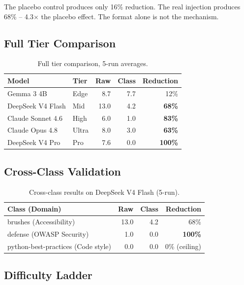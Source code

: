\documentclass{article}
\begin{document}
The placebo control produces only 16\% reduction. The real injection produces
68\% -- 4.3$\times$ the placebo effect. The format alone is not the mechanism.

\subsection{Full Tier Comparison}

\begin{table}[h]
\centering
\begin{tabular}{llrrr}
\toprule
Model & Tier & Raw & Class & Reduction \\
\midrule
Gemma 3 4B & Edge & 8.7 & 7.7 & 12\% \\
DeepSeek V4 Flash & Mid & 13.0 & 4.2 & \textbf{68\%} \\
Claude Sonnet 4.6 & High & 6.0 & 1.0 & \textbf{83\%} \\
Claude Opus 4.8 & Ultra & 8.0 & 3.0 & \textbf{63\%} \\
DeepSeek V4 Pro & Pro & 7.6 & 0.0 & \textbf{100\%} \\
\bottomrule
\end{tabular}
\caption{Full tier comparison, 5-run averages.}\label{tab:tiers}
\end{table}

\subsection{Cross-Class Validation}

\begin{table}[h]
\centering
\begin{tabular}{lrrr}
\toprule
Class (Domain) & Raw & Class & Reduction \\
\midrule
brushes (Accessibility) & 13.0 & 4.2 & 68\% \\
defense (OWASP Security) & 1.0 & 0.0 & \textbf{100\%} \\
python-best-practices (Code style) & 0.0 & 0.0 & 0\% (ceiling) \\
\bottomrule
\end{tabular}
\caption{Cross-class results on DeepSeek V4 Flash (5-run).}\label{tab:cross}
\end{table}

\subsection{Difficulty Ladder}
\end{document}
